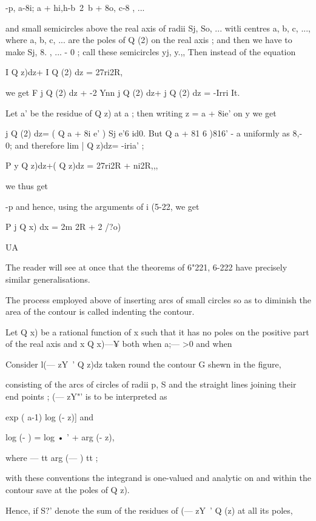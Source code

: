 -p, a-8i; a + hi,h-b~2\ b + 8o, c-8 , ...

and small semicircles above the real axis of radii Sj, So, ... witli
centres a, b, c, ..., where a, b, c, ... are the poles of Q (2) on the
real axis ; and then we have to make Sj, 8. , ... - 0 ; call these
semicircles yj, y.,, Then instead of the equation

I Q z)dz+ I Q (2) dz = 27ri2R,

we get F j Q (2) dz + -2 Ynn j Q (2) dz+ j Q (2) dz = -Irri It.

Let a' be the residue of Q z) at a ; then writing z = a + 8ie' on y we
get

j Q (2) dz= ( Q a + 8i e' ) Sj e'6 id0. But Q a + 81 6 )816' - a
uniformly as 8,- 0; and therefore lim | Q z)dz= -iria' ;

P y Q z)dz+( Q z)dz = 27ri2R + ni2R,,,

we thus get

-p and hence, using the arguments of i (5-22, we get

P j Q x) dx = 2m 2R + 2 /?o)

UA

The reader will see at once that the theorems of 6"221, 6-222 have
precisely similar generalisations.

The process employed above of inserting arcs of small circles so as to
diminish the area of the contour is called indenting the contour.

Let Q x) be a rational function of x such that it has no poles on the
positive part of the real axis and x Q x)—¥ both when a;— >0 and when

%
%

Consider l(— zY~' Q z)dz taken round the contour G shewn in the
figure,

consisting of the arcs of circles of radii p, S and the straight lines
joining their end points ; (— zY"' is to be interpreted as

exp ( a-1) log (- z)] and

log (- ) = log • ' + arg (- z),

where — tt arg (— ) tt ;

with these conventions the integrand is one-valued and analytic on and
within the contour save at the poles of Q z).

Hence, if S?' denote the sum of the residues of (— zY~' Q (z) at all
its poles,

